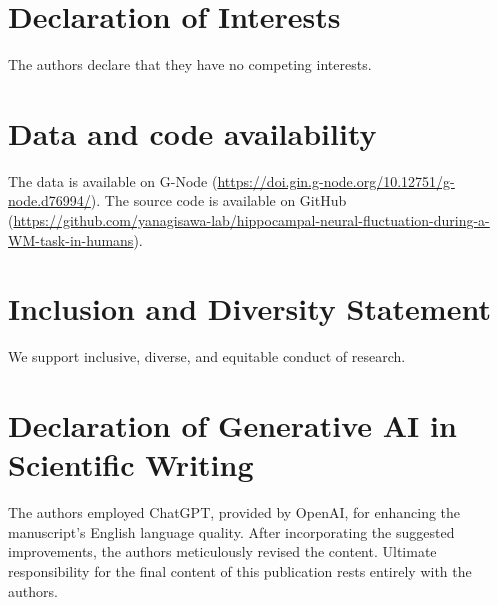 \documentclass[final,3p,times,twocolumn]{elsarticle}
\begin{document}
\section*{Declaration of Interests}
The authors declare that they have no competing interests.
\label{declaration of interests}

\section*{Data and code availability}
The data is available on G-Node (\url{https://doi.gin.g-node.org/10.12751/g-node.d76994/}). The source code is available on GitHub (\url{https://github.com/yanagisawa-lab/hippocampal-neural-fluctuation-during-a-WM-task-in-humans}).
\label{data and code availability}

\section*{Inclusion and Diversity Statement}
We support inclusive, diverse, and equitable conduct of research.
\label{inclusion and diversity statement}

\section*{Declaration of Generative AI in Scientific Writing}
The authors employed ChatGPT, provided by OpenAI, for enhancing the manuscript's English language quality. After incorporating the suggested improvements, the authors meticulously revised the content. Ultimate responsibility for the final content of this publication rests entirely with the authors.
\label{declaration of generative ai in scientific writing}



\clearpage
\end{document}
